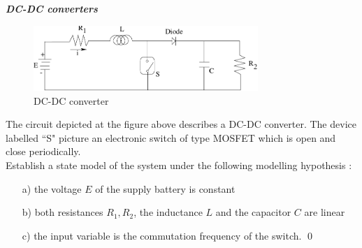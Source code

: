 \begin{exercice}{\bf \em DC-DC converters}

\begin{figure}[htbp]
\begin{center}
\includegraphics[width=85mm]{DCDC}
\caption{DC-DC converter}
\label{fig:DCDC}
\end{center}
\end{figure}
The circuit depicted at the figure above describes a DC-DC converter.  
The device labelled ``S" picture an electronic switch of type MOSFET 
which is open and close periodically.\\

Establish a state model of the system under the following modelling 
hypothesis :
\begin{itemize}
\item[a)] the voltage $E$ of the supply battery is constant
\item[b)] both resistances $R_1, R_2$, the inductance $L$ and the 
capacitor $C$ are linear
\item[c)] the input variable is the commutation frequency of the switch. \qed
\end{itemize} 
\end{exercice}



